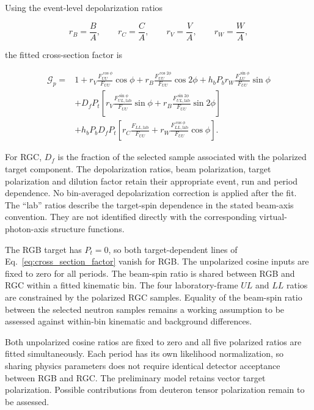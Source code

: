 Using the event-level depolarization ratios
\begin{linenomath}
\begin{equation}
 r_B=\frac{B}{A},\qquad r_C=\frac{C}{A},\qquad
 r_V=\frac{V}{A},\qquad r_W=\frac{W}{A},
\end{equation}
\end{linenomath}
the fitted cross-section factor is
\begin{linenomath}
\begin{align}
\label{eq:cross_section_factor}
\mathcal{G}_p={}&1
 +r_V\frac{F_{UU}^{\cos\phi}}{F_{UU}}\cos\phi
 +r_B\frac{F_{UU}^{\cos2\phi}}{F_{UU}}\cos2\phi
 +h_bP_b r_W\frac{F_{LU}^{\sin\phi}}{F_{UU}}\sin\phi
 \nonumber\\
 &+D_fP_t\left[
 r_V\frac{F_{UL,\mathrm{lab}}^{\sin\phi}}{F_{UU}}\sin\phi
 +r_B\frac{F_{UL,\mathrm{lab}}^{\sin2\phi}}{F_{UU}}\sin2\phi
 \right]
 \nonumber\\
 &+h_bP_bD_fP_t\left[
 r_C\frac{F_{LL,\mathrm{lab}}}{F_{UU}}
 +r_W\frac{F_{LL,\mathrm{lab}}^{\cos\phi}}{F_{UU}}\cos\phi
 \right].
\end{align}
\end{linenomath}
For RGC, $D_f$ is the fraction of the selected sample associated with the polarized target component. The depolarization ratios, beam polarization, target polarization and dilution factor retain their appropriate event, run and period dependence. No bin-averaged depolarization correction is applied after the fit. The ``lab'' ratios describe the target-spin dependence in the stated beam-axis convention. They are not identified directly with the corresponding virtual-photon-axis structure functions.

The RGB target has $P_t=0$, so both target-dependent lines of Eq.~\ref{eq:cross_section_factor} vanish for RGB. The unpolarized cosine inputs are fixed to zero for all periods. The beam-spin ratio is shared between RGB and RGC within a fitted kinematic bin. The four laboratory-frame $UL$ and $LL$ ratios are constrained by the polarized RGC samples. Equality of the beam-spin ratio between the selected neutron samples remains a working assumption to be assessed against within-bin kinematic and background differences.

Both unpolarized cosine ratios are fixed to zero and all five polarized ratios are fitted simultaneously. Each period has its own likelihood normalization, so sharing physics parameters does not require identical detector acceptance between RGB and RGC. The preliminary model retains vector target polarization. Possible contributions from deuteron tensor polarization remain to be assessed.
